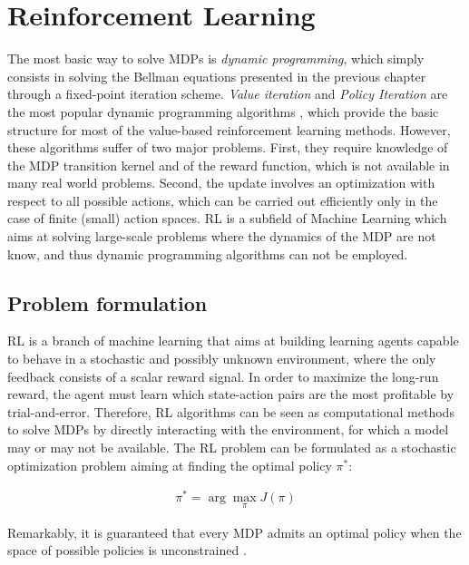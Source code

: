\section{Reinforcement Learning}
The most basic way to solve \gls{MDP}s is \emph{dynamic programming}, which simply consists in solving the Bellman equations presented in the previous chapter through a fixed-point iteration scheme. \emph{Value iteration} and \emph{Policy Iteration} are the most popular dynamic programming algorithms \cite{sutton2018reinforcement}, which provide the basic structure for most of the value-based reinforcement learning methods. However, these algorithms suffer of two major problems. First, they require knowledge of the \gls{MDP} transition kernel and of the reward function, which is not available in many real world problems. Second, the update involves an optimization with respect to all possible actions, which can be carried out efficiently only in the case of finite (small) action spaces. 
\gls{RL} is a subfield of Machine Learning which aims at solving large-scale problems where the dynamics of the \gls{MDP} are not know, and thus dynamic programming algorithms can not be employed. 

\subsection{Problem formulation}
\gls{RL} is a branch of machine learning that aims at building learning agents capable to behave in a stochastic and possibly unknown environment, where the only feedback consists of a scalar reward signal. In order to maximize the long-run reward, the agent must learn which state-action pairs are the most profitable by trial-and-error. Therefore, \gls{RL} algorithms can be seen as computational methods to solve \gls{MDP}s by directly interacting with the environment, for which a model may or may not be available. The \gls{RL} problem can be formulated as a stochastic optimization problem aiming at finding the optimal policy $\pi^{*}$:

\begin{align}
\pi^* = \arg \max_{\pi} J(\pi)
\end{align}

Remarkably, it is guaranteed that every \gls{MDP} admits an optimal policy when the space of possible policies is unconstrained  \cite{puterman2014markov}.

